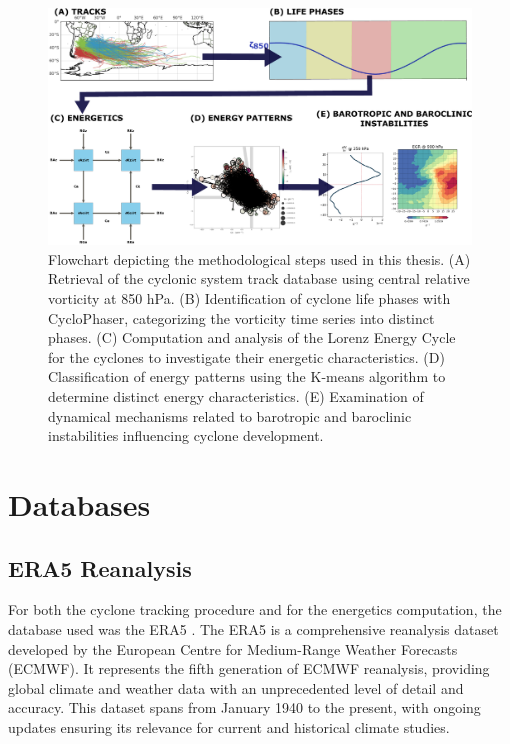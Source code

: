\begin{figure}[h!]
  \centering
  \includegraphics[width=\textwidth]{figs_3/flow_chart.pdf}
  \caption{Flowchart depicting the methodological steps used in this thesis. (A) Retrieval of the cyclonic system track database using central relative vorticity at 850 hPa. (B) Identification of cyclone life phases with CycloPhaser, categorizing the vorticity time series into distinct phases. (C) Computation and analysis of the Lorenz Energy Cycle for the cyclones to investigate their energetic characteristics. (D) Classification of energy patterns using the K-means algorithm to determine distinct energy characteristics. (E) Examination of dynamical mechanisms related to barotropic and baroclinic instabilities influencing cyclone development.}
  \label{fig:flow_chart}
\end{figure}

\section{Databases}

\subsection{ERA5 Reanalysis}
\label{sec:era5}

For both the cyclone tracking procedure and for the energetics computation, the database used was the ERA5 \citep{hersbach2020era5}. The ERA5 is a comprehensive reanalysis dataset developed by the European Centre for Medium-Range Weather Forecasts (ECMWF). It represents the fifth generation of ECMWF reanalysis, providing global climate and weather data with an unprecedented level of detail and accuracy. This dataset spans from January 1940 to the present, with ongoing updates ensuring its relevance for current and historical climate studies.

